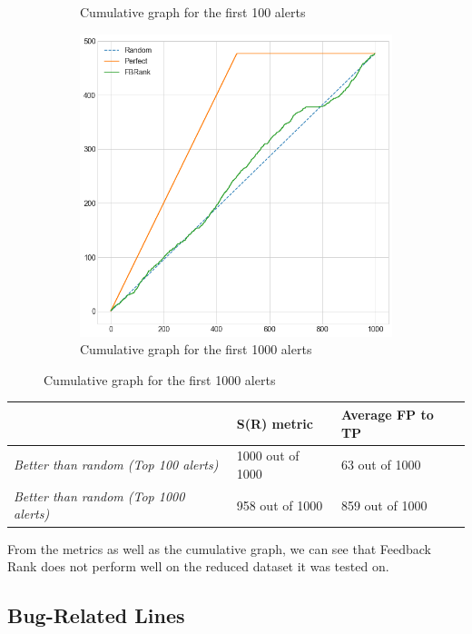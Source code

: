\begin{figure}[H]
\begin{subfigure}{.5\textwidth}
		\caption{Cumulative graph for the first 100 alerts}\label{}
	\end{subfigure}%
	\begin{subfigure}{.5\textwidth}
		\centering
		\includegraphics[scale=0.3]{./src/fbRank/fbrank_cumulative_graph_top1000.png}
		\caption{Cumulative graph for the first 1000 alerts}\label{}
	\end{subfigure}  
\end{figure}

\begin{table}[H]
	\centering
	\begin{tabular}{@{}lll@{}}
		\toprule
		& \textbf{S(R) metric} & \textbf{Average FP to TP} \\ \midrule
		\textit{Better than random (Top 100 alerts)}  & 1000 out of 1000       & 63 out of 1000           \\
		\textit{Better than random (Top 1000 alerts)} & 958 out of 1000      & 859 out of 1000          \\ \bottomrule
	\end{tabular}
\end{table}

From the metrics as well as the cumulative graph, we can see that Feedback Rank does not perform well on the reduced dataset it was tested on.


\subsection{Bug-Related Lines}

